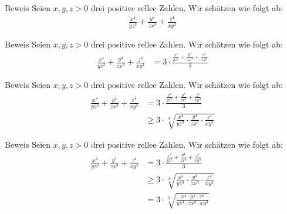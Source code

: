 \documentclass[10pt]{beamer}
\begin{document}
\begin{frame}{Beweis}
    Seien \( x, y, z > 0 \) drei positive rellee Zahlen. Wir schätzen wie folgt ab:
    \begin{align*}
        \frac{x^{4}}{y z^{3}} + \frac{y^{4}}{z x^{3}} + \frac{z^{4}}{x y^{3}}
    \end{align*}
\end{frame}



\begin{frame}{Beweis}
    Seien \( x, y, z > 0 \) drei positive rellee Zahlen. Wir schätzen wie folgt ab:
    \begin{align*}
        \frac{x^{4}}{y z^{3}} + \frac{y^{4}}{z x^{3}} + \frac{z^{4}}{x y^{3}}
        & = 3 \cdot \frac{\frac{x^{4}}{y z^{3}} + \frac{y^{4}}{z x^{3}} + \frac{z^{4}}{x y^{3}}}{3}
    \end{align*}
\end{frame}



\begin{frame}{Beweis}
    Seien \( x, y, z > 0 \) drei positive rellee Zahlen. Wir schätzen wie folgt ab:
    \begin{align*}
        \frac{x^{4}}{y z^{3}} + \frac{y^{4}}{z x^{3}} + \frac{z^{4}}{x y^{3}}
        & = 3 \cdot \frac{\frac{x^{4}}{y z^{3}} + \frac{y^{4}}{z x^{3}} + \frac{z^{4}}{x y^{3}}}{3} \\
        & \geq 3 \cdot \sqrt[3]{\frac{x^{4}}{y z^{3}} \cdot \frac{y^{4}}{z x^{3}} \cdot \frac{z^{4}}{x y^{3}}}
    \end{align*}
\end{frame}



\begin{frame}{Beweis}
    Seien \( x, y, z > 0 \) drei positive rellee Zahlen. Wir schätzen wie folgt ab:
    \begin{align*}
        \frac{x^{4}}{y z^{3}} + \frac{y^{4}}{z x^{3}} + \frac{z^{4}}{x y^{3}}
        & = 3 \cdot \frac{\frac{x^{4}}{y z^{3}} + \frac{y^{4}}{z x^{3}} + \frac{z^{4}}{x y^{3}}}{3} \\
        & \geq 3 \cdot \sqrt[3]{\frac{x^{4}}{y z^{3}} \cdot \frac{y^{4}}{z x^{3}} \cdot \frac{z^{4}}{x y^{3}}} \\
        & = 3 \cdot \sqrt[3]{\frac{x^{4} \cdot y^{4} \cdot z^{4}}{y z^{3} \cdot z x^{3} \cdot x y^{3}}}
    \end{align*}
\end{frame}
\end{document}

